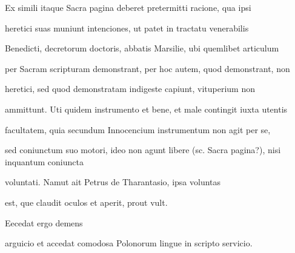 Ex simili itaque Sacra pagina deberet pretermitti racione, qua ipsi

heretici suas muniunt intenciones, ut patet in tractatu venerabilis

Benedicti, decretorum doctoris, abbatis Marsilie, ubi quemlibet articulum

per Sacram scripturam demonstrant, per hoc autem, quod demonstrant, non 

 heretici, sed quod demonstratam indigeste capiunt, vituperium non

ammittunt. Uti quidem instrumento et bene, et male contingit iuxta utentis

facultatem, quia secundum Innocencium instrumentum non agit per se,

sed coniunctum suo motori, ideo non agunt libere (sc. Sacra pagina?), nisi inquantum coniuncta 

 voluntati. Namut ait Petrus de Tharantasio, ipsa voluntas

\splitlines{}

est, que claudit oculos et aperit, prout vult.

\indentK Eecedat ergo demens 



\fullpreviouslines


{
\color{blue}

arguicio et accedat comodosa Polonorum lingue in scripto servicio.

}


